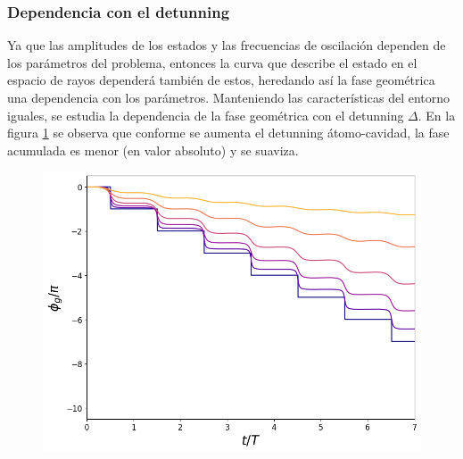 \subsubsection{Dependencia con el detunning}
Ya que las amplitudes de los estados y las frecuencias de oscilación dependen de los parámetros del problema, entonces la curva que describe el estado en el espacio de rayos dependerá también de estos, heredando así la fase geométrica una dependencia con los parámetros. Manteniendo las características del entorno iguales, se estudia la dependencia de la fase geométrica con el detunning $\Delta$. En la figura \ref{fig3:fg detunning} se observa que conforme se aumenta el detunning átomo-cavidad, la fase acumulada es menor (en valor absoluto) y se suaviza.
\begin{figure}[H]
    \begin{minipage}[c]{0.67\textwidth}
        \includegraphics[width=\textwidth]{figuras/ch3/fg detunning.png}
    \end{minipage}\hfill
    \begin{minipage}[c]{0.3\textwidth}
    \caption{
         } \label{fig3:fg detunning}
  \end{minipage}
\end{figure}

